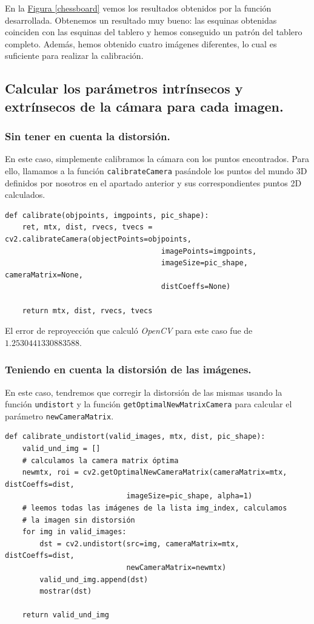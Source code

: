 \documentclass[11pt,a4paper]{article}
\theoremstyle{plain}
\theoremstyle{definition}
\begin{document}
En la \hyperref[chessboard]{Figura \ref*{chessboard}} vemos los resultados obtenidos por la función desarrollada. Obtenemos un resultado muy bueno: las esquinas obtenidas coinciden con las esquinas del tablero y hemos conseguido un patrón del tablero completo. Además, hemos obtenido cuatro imágenes diferentes, lo cual es suficiente para realizar la calibración.

\subsection{Calcular los parámetros intrínsecos y extrínsecos de la cámara para cada imagen.}

\subsubsection{Sin tener en cuenta la distorsión.}

En este caso, simplemente calibramos la cámara con los puntos encontrados. Para ello, llamamos a la función \texttt{calibrateCamera} pasándole los puntos del mundo 3D definidos por nosotros en el apartado anterior y sus correspondientes puntos 2D calculados.

\begin{verbatim}
def calibrate(objpoints, imgpoints, pic_shape):
    ret, mtx, dist, rvecs, tvecs = cv2.calibrateCamera(objectPoints=objpoints, 
                                    imagePoints=imgpoints,
                                    imageSize=pic_shape, cameraMatrix=None, 
                                    distCoeffs=None)

    return mtx, dist, rvecs, tvecs
\end{verbatim}

El error de reproyección que calculó \textit{OpenCV} para este caso fue de $1.2530441330883588$.

\subsubsection{Teniendo en cuenta la distorsión de las imágenes.}

En este caso, tendremos que corregir la distorsión de las mismas usando la función \texttt{undistort} y la función \texttt{getOptimalNewMatrixCamera} para calcular el parámetro \texttt{newCameraMatrix}.

\begin{verbatim}
def calibrate_undistort(valid_images, mtx, dist, pic_shape):
    valid_und_img = []
    # calculamos la camera matrix óptima
    newmtx, roi = cv2.getOptimalNewCameraMatrix(cameraMatrix=mtx, distCoeffs=dist, 
                            imageSize=pic_shape, alpha=1)
    # leemos todas las imágenes de la lista img_index, calculamos 
    # la imagen sin distorsión
    for img in valid_images:
        dst = cv2.undistort(src=img, cameraMatrix=mtx, distCoeffs=dist, 
                            newCameraMatrix=newmtx)
        valid_und_img.append(dst)
        mostrar(dst)
    
    return valid_und_img
\end{verbatim}
\end{document}
